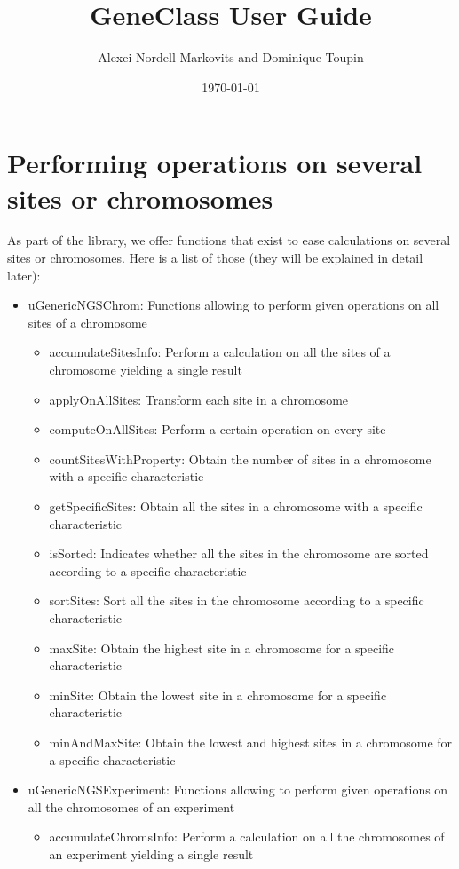 \documentclass[letterpaper,10pt]{article}
\title{GeneClass User Guide}
\author{Alexei Nordell Markovits and Dominique Toupin}
\date\today
\begin{document}
\maketitle
\tableofcontents
\clearpage
\section{Performing operations on several sites or chromosomes}
As part of the library, we offer functions that exist to ease calculations on several sites or chromosomes. Here is a list of those (they will be explained in detail later):
\begin{itemize}
 \item uGenericNGSChrom: Functions allowing to perform given operations on all sites of a chromosome
  \begin{itemize}
    \item accumulateSitesInfo: Perform a calculation on all the sites of a chromosome yielding a single result
    \item applyOnAllSites: Transform each site in a chromosome
    \item computeOnAllSites: Perform a certain operation on every site
    \item countSitesWithProperty: Obtain the number of sites in a chromosome with a specific characteristic
    \item getSpecificSites: Obtain all the sites in a chromosome with a specific characteristic
    \item isSorted: Indicates whether all the sites in the chromosome are sorted according to a specific characteristic
    \item sortSites: Sort all the sites in the chromosome according to a specific characteristic
    \item maxSite: Obtain the highest site in a chromosome for a specific characteristic
    \item minSite: Obtain the lowest site in a chromosome for a specific characteristic
    \item minAndMaxSite: Obtain the lowest and highest sites in a chromosome for a specific characteristic
  \end{itemize}
 \item uGenericNGSExperiment: Functions allowing to perform given operations on all the chromosomes of an experiment
  \begin{itemize}
    \item accumulateChromsInfo: Perform a calculation on all the chromosomes of an experiment yielding a single result

\end{itemize}
\end{itemize}
\end{document}
